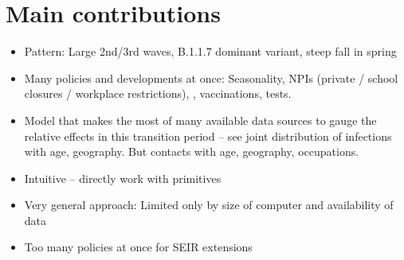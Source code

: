 


\section{Main contributions}

\begin{itemize}
    \item Pattern: Large 2nd/3rd waves, B.1.1.7 dominant variant, steep fall in spring
    \item Many policies and developments at once: Seasonality, NPIs (private / school closures / workplace restrictions), , vaccinations, tests.
    \item Model that makes the most of many available data sources to gauge the relative effects in this transition period -- see joint distribution of infections with age, geography. But contacts with age, geography, occupations.
    \item Intuitive -- directly work with primitives
    \item Very general approach: Limited only by size of computer and availability of data
    \item Too many policies at once for SEIR extensions
\end{itemize}




\clearpage

